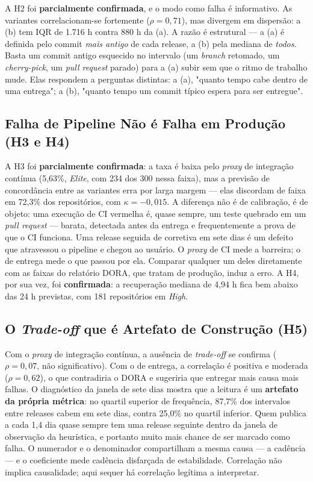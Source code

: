 \documentclass[12pt]{article}
\begin{document}
A H2 foi \textbf{parcialmente confirmada}, e o modo como falha é informativo. As variantes
correlacionam-se fortemente ($\rho = 0{,}71$), mas divergem em dispersão: a (b) tem IQR de
1.716 h contra 880 h da (a). A razão é estrutural --- a (a) é definida pelo commit \emph{mais
antigo} de cada release, a (b) pela mediana de \emph{todos}. Basta um commit antigo esquecido
no intervalo (um \emph{branch} retomado, um \emph{cherry-pick}, um \emph{pull request}
parado) para a (a) subir sem que o ritmo de trabalho mude. Elas respondem a perguntas
distintas: a (a), "quanto tempo cabe dentro de uma entrega"; a (b), "quanto tempo um commit
típico espera para ser entregue".

\subsection{Falha de Pipeline Não é Falha em Produção (H3 e H4)}

A H3 foi \textbf{parcialmente confirmada}: a taxa é baixa pelo \emph{proxy} de integração contínua (5,63\%,
\emph{Elite}, com 234 dos 300 nessa faixa), mas a previsão de concordância entre as variantes
erra por larga margem --- elas discordam de faixa em 72,3\% dos repositórios, com
$\kappa = -0{,}015$. A diferença não é de calibração, é de objeto: uma execução de CI
vermelha é, quase sempre, um teste quebrado em um \emph{pull request} --- barata, detectada
antes da entrega e frequentemente a prova de que o CI funciona. Uma release seguida de
corretiva em sete dias é um defeito que atravessou o pipeline e chegou ao usuário. O
\emph{proxy} de CI mede a barreira; o de entrega mede o que passou por ela. Comparar qualquer
um deles diretamente com as faixas do relatório DORA, que tratam de produção, induz a erro.
A H4, por sua vez, foi \textbf{confirmada}: a recuperação mediana de 4,94 h fica bem abaixo
das 24 h previstas, com 181 repositórios em \emph{High}.

\subsection{O \emph{Trade-off} que é Artefato de Construção (H5)}

Com o \emph{proxy} de integração contínua, a ausência de \emph{trade-off} se confirma ($\rho = 0{,}07$, não
significativo). Com o de entrega, a correlação é positiva e moderada ($\rho = 0{,}62$), o que
contradiria o DORA e sugeriria que entregar mais causa mais falhas. O diagnóstico da janela
de sete dias mostra que a leitura é um \textbf{artefato da própria métrica}: no quartil
superior de frequência, 87,7\% dos intervalos entre releases cabem em sete dias, contra
25,0\% no quartil inferior. Quem publica a cada 1,4 dia quase sempre tem uma release seguinte
dentro da janela de observação da heurística, e portanto muito mais chance de ser marcado
como falha. O numerador e o denominador compartilham a mesma causa --- a cadência --- e o
coeficiente mede cadência disfarçada de estabilidade. Correlação não implica causalidade;
aqui sequer há correlação legítima a interpretar.
\end{document}
